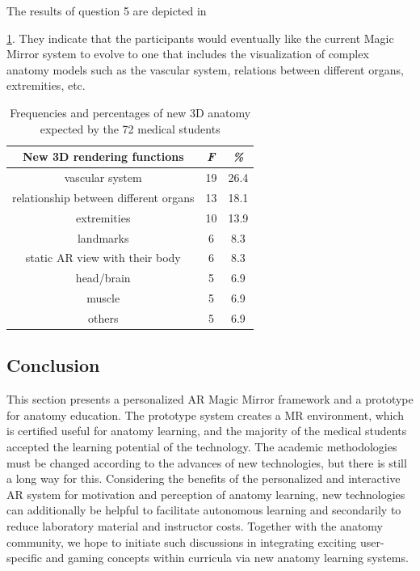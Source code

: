 {{{{{The results of question 5 are depicted in \tablename{\ref{tb:3-MMC:question5}. They indicate that the participants would eventually like the current Magic Mirror system to evolve to one that includes the visualization of complex anatomy models such as the vascular system, relations between different organs, extremities, etc. 
\begin{table}
	\caption[3D anatomy expected]{Frequencies and percentages of new 3D anatomy expected by the 72 medical students}
	\centering
	\label{tb:3-MMC:question5}
	\scriptsize
	\begin{center}
		\begin{tabular}{ccc}
			New 3D rendering functions & \textit{F} & \textit{\%} \\
			\hline
			vascular system &	19 &	26.4 \\
			relationship between different organs&	13	&18.1\\
			extremities &	10&	13.9\\
			landmarks&	6&	8.3\\
			static AR view with their body&	6	&8.3\\
			head/brain	&5	&6.9\\
			muscle&	5&	6.9\\
			others&	5&	6.9\\
			\hline
		\end{tabular}
	\end{center}
\end{table}

\subsection{Conclusion}
This section presents a personalized AR Magic Mirror framework and a prototype for anatomy education.
The prototype system creates a MR environment, which is certified useful for anatomy learning, and the majority of the medical students accepted the learning potential of the technology. 
The academic methodologies must be changed according to the advances of new technologies, but there is still a long way for this. 
Considering the benefits of the personalized and interactive AR system for motivation and perception of anatomy learning, new technologies can additionally be helpful to facilitate autonomous learning and secondarily to reduce laboratory material and instructor costs. Together with the anatomy community, we hope to initiate such discussions in integrating exciting user-specific and gaming concepts within curricula via new anatomy learning systems. 

}}}}}}
